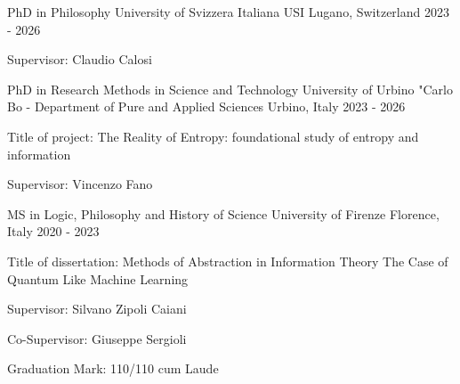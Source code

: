 

\begin{cventries}

  \cventry
  {PhD in Philosophy} %
    {University of Svizzera Italiana USI} %
    {Lugano, Switzerland} %
    {2023 - 2026} %
    {
      \begin{cvitems} %
        \item {Supervisor: Claudio Calosi}
      \end{cvitems}
    }
    \vspace{7mm}
    
 \cventry
    {PhD in Research Methods in Science and Technology} %
    {University of Urbino "Carlo Bo - Department of Pure and Applied Sciences} %
    {Urbino, Italy} %
    {2023 - 2026} %
    {
      \begin{cvitems} %
        \item {Title of project: The Reality of Entropy: foundational study of entropy and information}
        \item {Supervisor: Vincenzo Fano}
      \end{cvitems}
    }
    \vspace{7mm}

  \cventry
    {MS in Logic, Philosophy and History of Science} %
    {University of Firenze} %
    {Florence, Italy} %
    {2020 - 2023} %
    {
      \begin{cvitems} %
      \item {Title of dissertation: Methods of Abstraction in Information Theory The Case of Quantum Like Machine Learning}
        \item {Supervisor: Silvano Zipoli Caiani }
        \item {Co-Supervisor: Giuseppe Sergioli}
        \item {Graduation Mark: 110/110 cum Laude}
      \end{cvitems}
    }
    \vspace{7mm}


\end{cventries}
